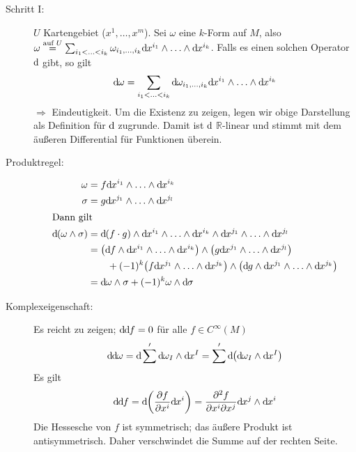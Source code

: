 \begin{description}
	\item[Schritt I:] $U$ Kartengebiet ($x^1, \ldots , x^m$). Sei $\omega$ eine $k$-Form auf $M$, also $\omega \stackrel{\text{auf $U$}}{=} \sum_{i_1 < \ldots < i_k} 
	\omega_{i_1, \ldots , i_k} \mathrm{d}\mkern-1.0mu x^{i_1} \wedge \ldots \wedge \mathrm{d}\mkern-1.0mu x^{i_k}$. Falls es einen solchen Operator $\mathrm{d}\mkern-1.0mu$ gibt, so gilt
	\[
		\mathrm{d}\mkern-1.0mu \omega = \sum_{i_1 < \ldots <i_k} \mathrm{d}\mkern-1.0mu \omega_{i_1, \ldots , i_k} \mathrm{d}\mkern-1.0mu x^{i_1} \wedge \ldots \wedge \mathrm{d}\mkern-1.0mu x^{i_k}
	\]
	$\Rightarrow$ Eindeutigkeit. Um die Existenz zu zeigen, legen wir obige Darstellung als Definition für $\mathrm{d}\mkern-1.0mu$ zugrunde. Damit ist $\mathrm{d}\mkern-1.0mu$ $\mathds{R}$-linear und 	
	stimmt mit dem äußeren Differential für Funktionen überein.
	\item[Produktregel:] \oE 
	\begin{align*}
		\omega &= f \mathd x^{i_1} \wedge \ldots \wedge \mathd x^{i_k} \\
		\sigma &= g \mathd x^{j_1} \wedge \ldots \wedge \mathd x^{j_l} \\
		\intertext{Dann gilt}
		\mathd(\omega \wedge \sigma) &= \mathd (f \cdot g) \wedge \mathd x^{i_1} \wedge \ldots \wedge \mathd x^{i_k} \wedge \mathd x^{j_1} \wedge \ldots 
		\wedge \mathd x^{j_l} \\
		&= \enbrace*{\mathd f \wedge \mathd x^{i_1} \wedge \ldots \wedge \mathd x^{i_k}} \wedge \enbrace*{g \mathd x^{j_1} \wedge \ldots \wedge \mathd x^{j_l}} \\
		&\qquad + (-1)^k \enbrace*{f \mathd x^{j_1} \wedge\ldots\wedge\mathd x^{j_k}} \wedge\enbrace*{\mathd g \wedge \mathd x^{j_1} \wedge \ldots \wedge \mathd x^{j_k}} \\
		&= \mathd \omega \wedge \sigma + (-1)^k \omega \wedge \mathd \sigma
	\end{align*}
	\item[Komplexeigenschaft:] Es reicht zu zeigen; $\mathrm{d}\mkern-1.0mu \mathrm{d}\mkern-1.0mu f = 0$ für alle $f \in C^\infty(M)$
	\begin{align*}
		\mathd \mathd \omega = \mathd \sum' \mathd \omega_I \wedge \mathd x^I = \sum' \mathd \enbrace*{\mathd \omega_I \wedge \mathd x^I} 
	\end{align*}
	Es gilt
	\begin{align*}
		\mathd \mathd f = \mathd \enbrace*{\diff{f}{x^i} \mathd x^i} = \frac{\partial^2 f}{\partial x^i \partial x^j} \mathd x^j \wedge \mathd x^i 
	\end{align*}
	Die Hessesche von $f$ ist symmetrisch; das äußere Produkt ist antisymmetrisch. Daher verschwindet die Summe auf der rechten Seite.

\end{description}
